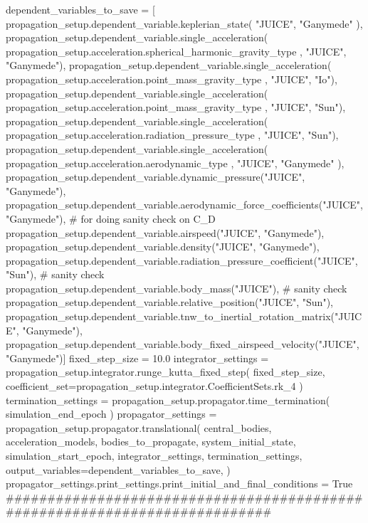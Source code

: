 {}dependent_variables_to_save = [ propagation_setup.dependent_variable.keplerian_state( "JUICE", "Ganymede" ), propagation_setup.dependent_variable.single_acceleration( propagation_setup.acceleration.spherical_harmonic_gravity_type , "JUICE", "Ganymede"), propagation_setup.dependent_variable.single_acceleration( propagation_setup.acceleration.point_mass_gravity_type , "JUICE", "Io"), propagation_setup.dependent_variable.single_acceleration( propagation_setup.acceleration.point_mass_gravity_type , "JUICE", "Sun"), propagation_setup.dependent_variable.single_acceleration( propagation_setup.acceleration.radiation_pressure_type , "JUICE", "Sun"), propagation_setup.dependent_variable.single_acceleration( propagation_setup.acceleration.aerodynamic_type , "JUICE", "Ganymede" ), propagation_setup.dependent_variable.dynamic_pressure("JUICE", "Ganymede"), propagation_setup.dependent_variable.aerodynamic_force_coefficients("JUICE", "Ganymede"), # for doing sanity check on C_D propagation_setup.dependent_variable.airspeed("JUICE", "Ganymede"), propagation_setup.dependent_variable.density("JUICE", "Ganymede"), propagation_setup.dependent_variable.radiation_pressure_coefficient("JUICE", "Sun"), # sanity check propagation_setup.dependent_variable.body_mass("JUICE"), # sanity check propagation_setup.dependent_variable.relative_position("JUICE", "Sun"), propagation_setup.dependent_variable.tnw_to_inertial_rotation_matrix("JUICE", "Ganymede"), propagation_setup.dependent_variable.body_fixed_airspeed_velocity("JUICE", "Ganymede")]\markdownRendererInterblockSeparator
{}
\markdownRendererSectionEnd \markdownRendererSectionBegin
{}\markdownRendererInterblockSeparator
{}fixed_step_size = 10.0 integrator_settings = propagation_setup.integrator.runge_kutta_fixed_step( fixed_step_size, coefficient_set=propagation_setup.integrator.CoefficientSets.rk_4 )\markdownRendererInterblockSeparator
{}
\markdownRendererSectionEnd \markdownRendererSectionBegin
{}\markdownRendererInterblockSeparator
{}termination_settings = propagation_setup.propagator.time_termination( simulation_end_epoch ) propagator_settings = propagation_setup.propagator.translational( central_bodies, acceleration_models, bodies_to_propagate, system_initial_state, simulation_start_epoch, integrator_settings, termination_settings, output_variables=dependent_variables_to_save, ) propagator_settings.print_settings.print_initial_and_final_conditions = True\markdownRendererInterblockSeparator
{}###########################################################################\markdownRendererInterblockSeparator
